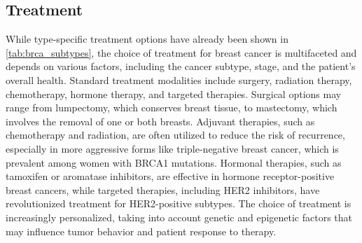 \subsection{Treatment}
\label{sec:brca_treatment}

While type-specific treatment options have already been shown in
\cref{tab:brca_subtypes}, the choice of treatment for breast cancer is
multifaceted and depends on various factors, including the cancer subtype,
stage, and the patient's overall health.
Standard treatment modalities include surgery, radiation therapy, chemotherapy,
hormone therapy, and targeted therapies.
Surgical options may range from lumpectomy, which conserves breast tissue, to
mastectomy, which involves the removal of one or both
breasts\supercite{metcalfe_contralateral_2014,wu_breast_2014}.
Adjuvant therapies, such as chemotherapy and radiation, are often utilized to
reduce the risk of recurrence, especially in more aggressive forms like
triple-negative breast cancer, which is prevalent among women with BRCA1
mutations\supercite{metcalfe_contralateral_2014}.
Hormonal therapies, such as tamoxifen or aromatase inhibitors, are effective in
hormone receptor-positive breast cancers, while targeted therapies, including
HER2 inhibitors, have revolutionized treatment for HER2-positive
subtypes\supercite{eccles_critical_2013,pace_breast_2016}.
The choice of treatment is increasingly personalized, taking into account
genetic and epigenetic factors that may influence tumor behavior and patient
response to therapy\supercite{khakpour_methylomics_2017}.

